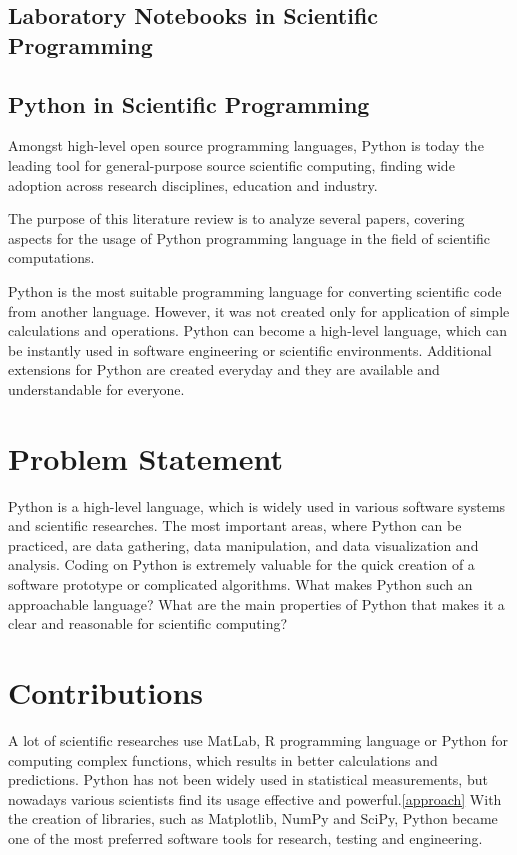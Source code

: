 \subsection{Laboratory Notebooks in Scientific Programming}
\subsection{Python in Scientific Programming}


%
%
Amongst high-level open source programming languages, Python is today the leading tool for general-purpose source scientific computing, finding wide adoption across research disciplines, education and industry.

The purpose of this literature review is to analyze several papers, covering aspects for the usage of Python programming language in the field of scientific computations. 

Python is the most suitable programming language for converting scientific code from another language. However, it was not created only for application of simple calculations and operations. Python can become a high-level language, which can be instantly used in software engineering or scientific environments. Additional extensions for Python are created everyday and they are available and understandable for everyone.

\section{Problem Statement}

Python is a high-level language, which is widely used in various software systems and scientific researches. The most important areas, where Python can be practiced, are data gathering, data manipulation, and data visualization and analysis. Coding on Python is extremely valuable for the quick creation of a software prototype or complicated algorithms. What makes Python such an approachable language? What are the main properties of Python that makes it a clear and reasonable for scientific computing? 


\section{Contributions}
A lot of scientific researches use MatLab, R programming language or Python for computing complex functions, which results in better calculations and predictions. Python has not been widely used in statistical measurements, but nowadays various scientists find its usage effective and powerful.\ref{approach} With the creation of libraries, such as Matplotlib, NumPy and SciPy, Python became one of the most preferred software tools for research, testing and engineering. 

